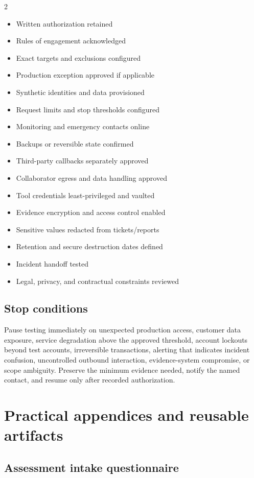\documentclass[11pt,letterpaper]{article}
\newcommand{\checkitem}{\item[$\square$]}
\begin{document}
\begin{multicols}{2}
\begin{itemize}
  \checkitem Written authorization retained
  \checkitem Rules of engagement acknowledged
  \checkitem Exact targets and exclusions configured
  \checkitem Production exception approved if applicable
  \checkitem Synthetic identities and data provisioned
  \checkitem Request limits and stop thresholds configured
  \checkitem Monitoring and emergency contacts online
  \checkitem Backups or reversible state confirmed
  \checkitem Third-party callbacks separately approved
  \checkitem Collaborator egress and data handling approved
  \checkitem Tool credentials least-privileged and vaulted
  \checkitem Evidence encryption and access control enabled
  \checkitem Sensitive values redacted from tickets/reports
  \checkitem Retention and secure destruction dates defined
  \checkitem Incident handoff tested
  \checkitem Legal, privacy, and contractual constraints reviewed
\end{itemize}
\end{multicols}

\subsection{Stop conditions}

Pause testing immediately on unexpected production access, customer data exposure, service degradation above the approved threshold, account lockouts beyond test accounts, irreversible transactions, alerting that indicates incident confusion, uncontrolled outbound interaction, evidence-system compromise, or scope ambiguity. Preserve the minimum evidence needed, notify the named contact, and resume only after recorded authorization.

\section{Practical appendices and reusable artifacts}

\subsection{Assessment intake questionnaire}
\end{document}
